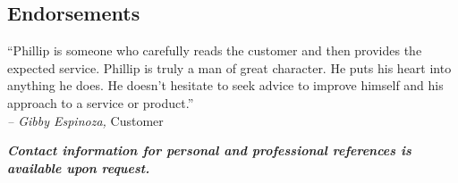 \documentclass[margin]{res}
\newcommand{\sectionspace}{\vspace{8pt}}
\begin{document}
\begin{resume}
\sectionspace


\section{\textsf{Endorsements}}

              
                ``Phillip is someone who carefully reads the customer and then provides the
expected service. Phillip is truly a man of great character. He puts his
heart into anything he does. He doesn't hesitate to seek advice to improve
himself and his approach to a service or product.''                    \\
                \textit{-- Gibby Espinoza,} Customer
              

\sectionspace


\sectionspace


\textit{\textbf{\footnotesize Contact information for personal and professional references is available upon request.}}


\end{resume}
\end{document}
